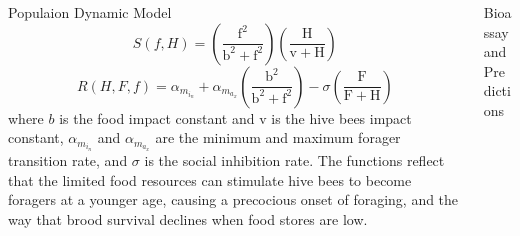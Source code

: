 \documentclass[final,t]{beamer}
\begin{document}
\begin{frame}[fragile]
\begin{columns}[t]
\begin{column}{0.19\linewidth}
\begin{block}{Populaion Dynamic Model}
        \begin{equation}
          S(f, H)= (\frac{\mathrm{f^2}}{\mathrm{b^2+f^2}})(\frac{\mathrm{H}}{\mathrm{v+H}})
        \end{equation}
        \begin{equation}
          R(H, F, f)=\alpha_m_i_n+\alpha_m_a_x(\frac{\mathrm{b^2}}{\mathrm{b^2+f^2}})-\sigma(\frac{\mathrm{F}}{\mathrm{F+H}})
        \end{equation}
        where $b$ is the food impact constant and v is the hive bees impact constant, $\alpha_m_i_n$ and $\alpha_m_a_x$ are the minimum and maximum forager transition rate, and $\sigma$ is the social inhibition rate. The functions reflect that the limited food resources can stimulate hive bees to become foragers at a younger age, causing a precocious onset of foraging, and the way that brood survival declines when food stores are low.
      \end{block}
    \end{column}%

    \begin{column}{0.16\linewidth}
      \begin{block}{Bioassay and Predictions}


\end{block}
\end{column}
\end{columns}
\end{frame}
\end{document}
